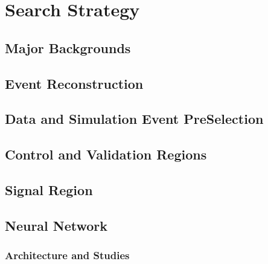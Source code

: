 
\chapter{Search Strategy}
\label{ch:SearchStrategy}
\section{Major Backgrounds}
\section{Event Reconstruction}
\section{Data and Simulation Event PreSelection}
\section{Control and Validation Regions}
\section{Signal Region}
\section{Neural Network}
\subsection{Architecture and Studies}


